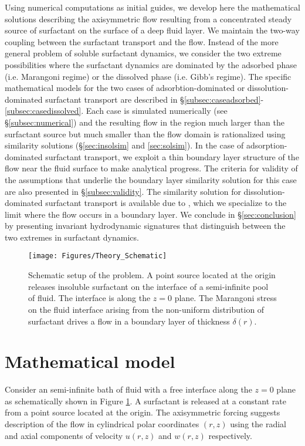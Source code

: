 \documentclass[]{jfm}
\begin{document}
Using numerical computations as initial guides, we develop here the mathematical solutions describing the axisymmetric flow resulting from a concentrated steady source of surfactant on the surface of a deep fluid layer.
We maintain the two-way coupling between the surfactant transport and the flow.
Instead of the more general problem of soluble surfactant dynamics, we consider the two extreme possibilities where the surfactant dynamics are dominated by the adsorbed phase (i.e. Marangoni regime) or the dissolved phase (i.e. Gibb's regime).
The specific mathematical models for the two cases of adsorbtion-dominated or dissolution-dominated surfactant transport are described in \S\ref{subsec:caseadsorbed}-\ref{subsec:casedissolved}.
Each case is simulated numerically (see \S \ref{subsec:numerical}) and the resulting flow in the region much larger than the surfactant source but much smaller than the flow domain is rationalized using similarity solutions (\S \ref{sec:insolsim} and \ref{sec:solsim}).
In the case of adsorption-dominated surfactant transport, we exploit a thin boundary layer structure of the flow near the fluid surface to make analytical progress.
The criteria for validity of the assumptions that underlie the boundary layer similarity solution for this case are also presented in \S\ref{subsec:validity}.
The similarity solution for dissolution-dominated surfactant transport is available due to \cite{Bratukhin1967}, which we specialize to the limit where the flow occurs in a boundary layer.
We conclude in \S\ref{sec:conclusion} by presenting invariant hydrodynamic signatures that distinguish between the two extremes in surfactant dynamics.

\begin{figure}
\texttt{[image: Figures/Theory\_Schematic]}
\caption{Schematic setup of the problem. A point source located at the origin releases insoluble surfactant on the interface of a semi-infinite pool of fluid. The interface is along the $z=0$ plane. The Marangoni stress on the fluid interface arising from the non-uniform distribution of surfactant drives a flow in a boundary layer of thickness $\delta(r)$.}
\label{fig:Theory_Schematic}
\end{figure}

\section{Mathematical model}
Consider an semi-infinite bath of fluid with a free interface along the $z=0$ plane as schematically shown in Figure \ref{fig:Theory_Schematic}.
A surfactant is released at a constant rate from a point source located at the origin.
The axisymmetric forcing suggests description of the flow in cylindrical polar coordinates $(r,z)$ using the radial and axial components of velocity $u(r,z)$ and $w(r,z)$ respectively.
\end{document}
